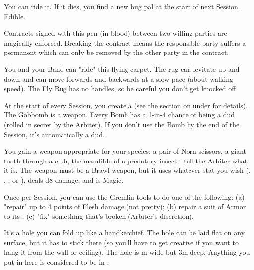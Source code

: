\begin{multicols*}{2}

You can ride it. If it dies, you find a new bug pal at the start of next Session.  Edible.


Contracts signed with this pen (in blood) between two willing parties are magically enforced. Breaking the contract means the responsible party suffers a permanent  which can only be removed by the other party in the contract.


You and your Band can "ride" this flying carpet.  The rug can levitate up and down and can move forwards and backwards at a slow pace (about walking speed).  The Fly Rug has no handles, so be careful you don't get knocked off.


At the start of every Session, you create a  (see the section on  under  for details). The Gobbomb is a \DEX weapon. Every Bomb has a 1-in-4 chance of being a dud (rolled in secret by the Arbiter).  If you don't use the Bomb by the end of the Session, it's automatically a dud.


You gain a weapon appropriate for your species: a pair of Norn scissors, a giant tooth through a club, the mandible of a predatory insect - tell the Arbiter what it is.  The weapon must be a Brawl weapon, but it uses whatever stat you wish (\VIG, \DEX, \INT, or \FOC), deals d8 damage, and is Magic.

\cbreak


Once per Session, you can use the Gremlin tools to do one of the following:  (a) "repair" up to 4 points of Flesh damage (not pretty); (b) repair a suit of Armor to its \MAX; (c) "fix" something that's broken (Arbiter's discretion).




It's a hole you can fold up like a handkerchief.  The hole can be laid flat on any surface, but it has to stick there (so you'll have to get creative if you want to hang it from the wall or ceiling).  The hole is \OneHalf m wide but 3m deep.  Anything you put in here is considered to be in .


\end{multicols*}
